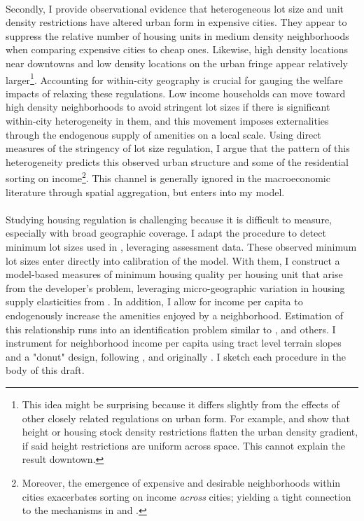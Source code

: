 \documentclass[]{article}
\begin{document}
\paragraph*{}
Secondly, I provide observational evidence that heterogeneous lot size and unit density restrictions have altered urban form in expensive cities. They appear to suppress the relative number of housing units in medium density neighborhoods when comparing expensive cities to cheap ones. Likewise, high density locations near downtowns and low density locations on the urban fringe appear relatively larger\footnote{This idea might be surprising because it  differs slightly from the effects of other closely related regulations on urban form. For example, \cite{bbheight} and \cite{mills2005} show that height or housing stock density restrictions flatten the urban density gradient, if said height restrictions are uniform across space. This cannot explain the result downtown.}. Accounting for within-city geography is crucial for gauging the welfare impacts of relaxing these regulations. Low income households can move toward high density neighborhoods to avoid stringent lot sizes if there is significant within-city heterogeneity in them, and this movement imposes externalities through the endogenous supply of amenities on a local scale. Using direct measures of the stringency of lot size regulation, I argue that the pattern of this heterogeneity predicts this observed urban structure and some of the residential sorting on income\footnote{Moreover, the emergence of expensive and desirable neighborhoods within cities exacerbates sorting on income \textit{across} cities; yielding a tight connection to the mechanisms in \cite{hseihmoretti} and \cite{durantonpugaurbgrowth}.}. This channel is generally ignored in the macroeconomic literature through spatial aggregation, but enters into my model.

\paragraph*{}
Studying housing regulation is challenging because it is difficult to measure, especially with broad geographic coverage. I adapt the procedure to detect minimum lot sizes used in \cite{Song}, leveraging assessment data. These observed minimum lot sizes enter directly into calibration of the model. With them, I construct a model-based measures of minimum housing quality per housing unit that arise from the developer's problem, leveraging micro-geographic variation in housing supply elasticities from \cite{BSH}. In addition, I allow for income per capita to endogenously increase the amenities enjoyed by a neighborhood. Estimation of this relationship runs into an identification problem similar to \cite{diamond2016}, and others. I instrument for neighborhood income per capita using tract level terrain slopes and a "donut" design, following \cite{anagoletal2021}, \cite{kulka} and originally \cite{BFMJPE}. I sketch each procedure in the body of this draft. 
\end{document}
